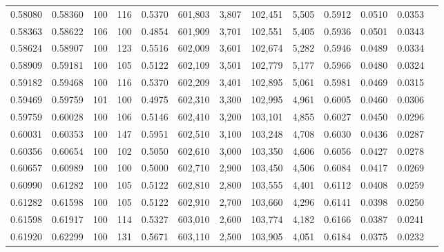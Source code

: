 \begin{tabular}{rrrrrrrrrrrrr}
0.58080 & 0.58360 &   100 & 116 &                                     0.5370 & 601,803 &   3,807 & 102,451 &   5,505 & 0.5912 & 0.0510 & 0.0353 \\
0.58363 & 0.58622 &   106 & 100 &                                     0.4854 & 601,909 &   3,701 & 102,551 &   5,405 & 0.5936 & 0.0501 & 0.0343 \\
0.58624 & 0.58907 &   100 & 123 &                                     0.5516 & 602,009 &   3,601 & 102,674 &   5,282 & 0.5946 & 0.0489 & 0.0334 \\
0.58909 & 0.59181 &   100 & 105 &                                     0.5122 & 602,109 &   3,501 & 102,779 &   5,177 & 0.5966 & 0.0480 & 0.0324 \\
0.59182 & 0.59468 &   100 & 116 &                                     0.5370 & 602,209 &   3,401 & 102,895 &   5,061 & 0.5981 & 0.0469 & 0.0315 \\
0.59469 & 0.59759 &   101 & 100 &                                     0.4975 & 602,310 &   3,300 & 102,995 &   4,961 & 0.6005 & 0.0460 & 0.0306 \\
0.59759 & 0.60028 &   100 & 106 &                                     0.5146 & 602,410 &   3,200 & 103,101 &   4,855 & 0.6027 & 0.0450 & 0.0296 \\
0.60031 & 0.60353 &   100 & 147 &                                     0.5951 & 602,510 &   3,100 & 103,248 &   4,708 & 0.6030 & 0.0436 & 0.0287 \\
0.60356 & 0.60654 &   100 & 102 &                                     0.5050 & 602,610 &   3,000 & 103,350 &   4,606 & 0.6056 & 0.0427 & 0.0278 \\
0.60657 & 0.60989 &   100 & 100 &                                     0.5000 & 602,710 &   2,900 & 103,450 &   4,506 & 0.6084 & 0.0417 & 0.0269 \\
0.60990 & 0.61282 &   100 & 105 &                                     0.5122 & 602,810 &   2,800 & 103,555 &   4,401 & 0.6112 & 0.0408 & 0.0259 \\
0.61282 & 0.61598 &   100 & 105 &                                     0.5122 & 602,910 &   2,700 & 103,660 &   4,296 & 0.6141 & 0.0398 & 0.0250 \\
0.61598 & 0.61917 &   100 & 114 &                                     0.5327 & 603,010 &   2,600 & 103,774 &   4,182 & 0.6166 & 0.0387 & 0.0241 \\
0.61920 & 0.62299 &   100 & 131 &                                     0.5671 & 603,110 &   2,500 & 103,905 &   4,051 & 0.6184 & 0.0375 & 0.0232 \\

\end{tabular}
